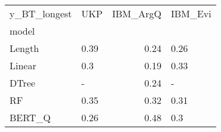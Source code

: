 \begin{tabular}{llrl}
\toprule
y\_BT\_longest &   UKP &  IBM\_ArgQ & IBM\_Evi \\
model  &       &           &         \\
\midrule
Length &  0.39 &      0.24 &    0.26 \\
Linear &   0.3 &      0.19 &    0.33 \\
DTree  &     - &      0.24 &       - \\
RF     &  0.35 &      0.32 &    0.31 \\
BERT\_Q &  0.26 &      0.48 &     0.3 \\
\bottomrule
\end{tabular}
